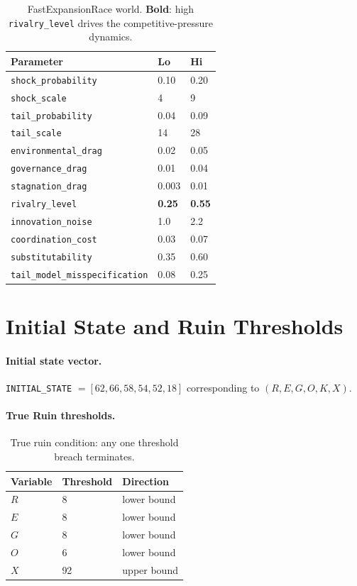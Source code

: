 \begin{table}[ht]
\centering
\small
\begin{tabularx}{\linewidth}{Xll}
\toprule
\textbf{Parameter} & \textbf{Lo} & \textbf{Hi} \\
\midrule
\texttt{shock\_probability} & 0.10 & 0.20 \\
\texttt{shock\_scale} & 4 & 9 \\
\texttt{tail\_probability} & 0.04 & 0.09 \\
\texttt{tail\_scale} & 14 & 28 \\
\texttt{environmental\_drag} & 0.02 & 0.05 \\
\texttt{governance\_drag} & 0.01 & 0.04 \\
\texttt{stagnation\_drag} & 0.003 & 0.01 \\
\texttt{rivalry\_level} & \textbf{0.25} & \textbf{0.55} \\
\texttt{innovation\_noise} & 1.0 & 2.2 \\
\texttt{coordination\_cost} & 0.03 & 0.07 \\
\texttt{substitutability} & 0.35 & 0.60 \\
\texttt{tail\_model\_misspecification} & 0.08 & 0.25 \\
\bottomrule
\end{tabularx}
\caption[FastExpansionRace world parameters]{FastExpansionRace
world. \textbf{Bold}: high \texttt{rivalry\_level} drives the
competitive-pressure dynamics.}
\label{tab:world-fast-expansion}
\end{table}

\section{Initial State and Ruin Thresholds}
\label{sec:world-initial-state}

\paragraph{Initial state vector.}
\texttt{INITIAL\_STATE} $= [62, 66, 58, 54, 52, 18]$ corresponding
to $(R, E, G, O, K, X)$.

\paragraph{True Ruin thresholds.}

\begin{table}[ht]
\centering
\small
\begin{tabularx}{\linewidth}{Xll}
\toprule
\textbf{Variable} & \textbf{Threshold} & \textbf{Direction} \\
\midrule
$R$ & 8 & lower bound \\
$E$ & 8 & lower bound \\
$G$ & 8 & lower bound \\
$O$ & 6 & lower bound \\
$X$ & 92 & upper bound \\
\bottomrule
\end{tabularx}
\caption[True ruin thresholds]{True ruin condition: any one
threshold breach terminates.}
\label{tab:ruin-thresholds}
\end{table}

